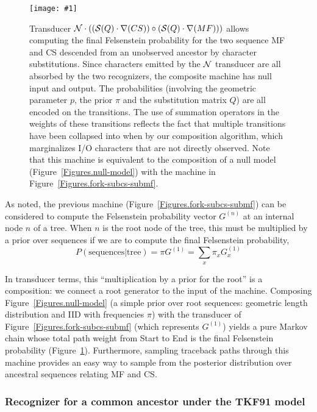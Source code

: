 \documentclass{article}
\newcommand{\figref}[1]{Figure~\ref{Figures.#1}}
\newcommand{\figlabel}[1]{\label{Figures.#1}}
\newcommand{\easyfig}[4]{
\begin{figure}
\texttt{[image: \#1]}
\caption{ \figlabel{#3} #4}
\end{figure}}
\newcommand{\widepdffig}[2]{\easyfig{#1-fig.pdf}{width=\textwidth}{#1}{#2}}
\newcommand\nullmodel{{\cal N}}
\newcommand\substitute{{\cal S}}
\newcommand\fork{\circ}
\newcommand\recognize{\nabla}
\begin{document}
\widepdffig{root-fork-subcs-submf}{Transducer $\nullmodel \cdot ((\substitute(Q) \cdot \recognize(CS))\fork(\substitute(Q) \cdot \recognize(MF)))$ 
allows computing  the final Felsenstein probability for the two sequence MF and CS descended from an unobserved ancestor
by character substitutions.  Since characters emitted by the $\nullmodel$ transducer are
all absorbed by the two recognizers, the composite machine has null input and output.
The probabilities (involving the geometric parameter $p$, the prior $\pi$ and the substitution matrix $Q$)
are all encoded on the transitions.
The use of summation operators in the weights of these transitions reflects the fact that multiple transitions have been collapsed into when
by our composition algorithm, which marginalizes I/O characters that are not directly observed.
Note that this machine is equivalent to the composition of a null model (\figref{null-model}) with the machine in \figref{fork-subcs-submf}.
}

As noted, the previous machine (\figref{fork-subcs-submf}) can be considered to compute the Felsenstein probability vector $G^{(n)}$ at an internal
node $n$ of a tree.  
When $n$ is the root node of the tree, this must be multiplied by a prior over sequences if we are to compute the final Felsenstein
probability,
\[
P(\mbox{sequences}|\mbox{tree}) = \pi G^{(1)} = \sum_x \pi_x G_x^{(1)}
\]

In transducer terms, this ``multiplication by a prior for the root'' is a composition: we connect a root generator to the input of the machine.
Composing \figref{null-model} (a simple prior over root sequences: geometric length distribution and IID with frequencies $\pi$)
with the transducer of \figref{fork-subcs-submf} (which represents $G^{(1)}$)
yields a pure Markov chain
whose total path weight from Start to End is the final Felsenstein probability (\figref{root-fork-subcs-submf}).  
Furthermore, sampling traceback paths through this machine provides an easy
way to  sample from the  posterior distribution over ancestral sequences relating MF and CS.  

\subsubsection{Recognizer for a common ancestor under the TKF91 model}
\end{document}
